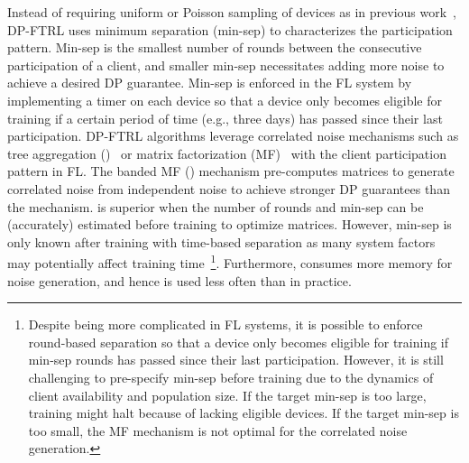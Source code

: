 Instead of requiring uniform or Poisson sampling of devices as in previous work~\citep{abadi2016deep,mcmahan2017learning}, DP-FTRL uses minimum separation (min-sep) to characterizes the participation pattern. Min-sep is the smallest number of rounds between the consecutive participation of a client, and smaller min-sep necessitates adding more noise to achieve a desired DP guarantee. Min-sep is enforced in the FL system by implementing a timer on each device so that a device only becomes eligible for training if a certain period of time (e.g., three days) has passed since their last participation.
DP-FTRL algorithms leverage correlated noise mechanisms such as tree aggregation (\treeagg)~\citep{kairouz21practical} or matrix factorization (MF)~\citep{choquette2023amplified} with the client participation pattern in FL. The banded MF (\bandmf) mechanism pre-computes matrices to generate  correlated noise from independent noise to achieve stronger DP guarantees than the \treeagg mechanism. \bandmf is superior when the number of rounds and min-sep can be (accurately) estimated before training to optimize matrices. However, min-sep is only known after training with time-based separation as many system factors may potentially affect training time~\footnote{Despite being more complicated in FL systems, it is possible to enforce round-based separation so that a device only becomes eligible for training if min-sep rounds has passed since their last participation. However, it is still challenging to pre-specify min-sep before training due to the dynamics of client availability and population size. If the target min-sep is too large, training might halt because of lacking eligible devices. If the target min-sep is too small, the MF mechanism is not optimal for the correlated noise generation.}.  Furthermore, \bandmf consumes more memory for noise generation, and hence is used less often than \treeagg in practice. 

